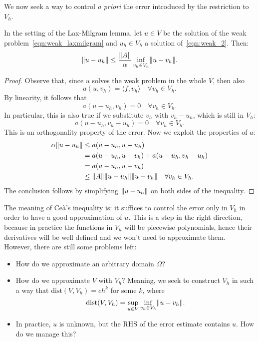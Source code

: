 We now seek a way to control \emph{a priori} the error introduced by the restriction to $V_h$.
\begin{lemma}[Ceà] \label{lemma:cea}
In the setting of the Lax-Milgram lemma, let $u\in V$ be the solution of the weak problem~\eqref{eqn:weak_laxmilgram} and $u_h \in V_h$ a solution of~\eqref{eqn:weak_2}. Then:
\[
\lVert u - u_h\rVert \le \frac{\lVert A\rVert}{\alpha} \inf_{v_h \in V_h} \lVert u - v_h\rVert.
\]
\end{lemma}
\begin{proof}
Observe that, since $u$ solves the weak problem in the whole $V$, then also
\[
a(u,v_h) = \langle f,v_h \rangle \quad \forall v_h\in V_h.
\]
By linearity, it follows that
\[
a(u - u_h,v_h) = 0 \quad \forall v_h\in V_h.
\]
In particular, this is also true if we substitute $v_h$ with $v_h - u_h$, which is still in $V_h$:
\[
a(u - u_h, v_h - u_h) = 0 \quad \forall v_h\in V_h.
\]
This is an orthogonality property of the error. Now we exploit the properties of $a$:
\begin{align}
\alpha \lVert u - u_h\rVert & \le a(u - u_h, u - u_h) \\
& = a(u - u_h, u - v_h) + a(u - u_h, v_h - u_h) \\
& = a(u - u_h, u - v_h) \\
& \le \lVert A\rVert \lVert u - u_h\rVert \lVert u - v_h\rVert \quad \forall v_h \in V_h.
\end{align}
The conclusion follows by simplifying $\lVert u - u_h\rVert$ on both sides of the inequality.
\end{proof}

The meaning of Ceà's inequality is: it suffices to control the error only in $V_h$ in order to have a good approximation of $u$. This is a step in the right direction, because in practice the functions in $V_h$ will be piecewise polynomials, hence their derivatives will be well defined and we won't need to approximate them. However, there are still some problems left:
\begin{itemize}
\item How do we approximate an arbitrary domain $\Omega$?
\item How do we approximate $V$ with $V_h$? Meaning, we seek to construct $V_h$ in such a way that $\text{dist}(V,V_h) = c h^k$ for some $k$, where
\[
\text{dist}(V,V_h) = \sup_{u\in V} \inf_{v_h \in V_h} \lVert u - v_h\rVert.
\]
\item In practice, $u$ is unknown, but the RHS of the error estimate contains $u$. How do we manage this?
\end{itemize}



